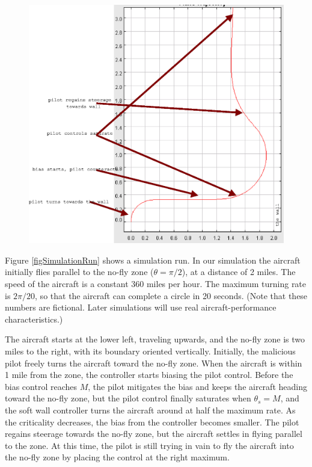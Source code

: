 \documentclass[11pt]{article}
\begin{document}
\begin{figure}[btp]
\centering
\includegraphics[width=5in]{simulationRun.eps}
\end{figure}

Figure \ref{figSimulationRun} shows a simulation run.  In our
simulation the aircraft initially flies parallel to the no-fly zone
($\theta = \pi / 2$), at a distance of 2 miles. The speed of the
aircraft is a constant 360 miles per hour. The maximum turning rate is
$2\pi/20$, so that the aircraft can complete a circle in 20
seconds. (Note that these numbers are fictional. Later simulations
will use real aircraft-performance characteristics.)

The aircraft starts at the lower left, traveling upwards, and the
no-fly zone is two miles to the right, with its boundary oriented
vertically.  Initially, the malicious pilot freely turns the aircraft
toward the no-fly zone. When the aircraft is within 1 mile from the
zone, the controller starts biasing the pilot control. Before the bias
control reaches $M$, the pilot mitigates the bias and keeps the
aircraft heading toward the no-fly zone, but the pilot control finally
saturates when $\theta_{s} = M$, and the soft wall controller turns
the aircraft around at half the maximum rate. As the criticality
decreases, the bias from the controller becomes smaller. The pilot
regains steerage towards the no-fly zone, but the aircraft settles in
flying parallel to the zone. At this time, the pilot is still trying
in vain to fly the aircraft into the no-fly zone by placing the
control at the right maximum.
\end{document}
